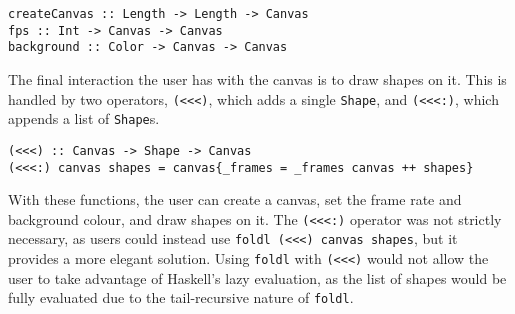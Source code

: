 \documentclass[../main.tex]{subfiles}
\begin{document}
        \begin{lstlisting}[label={lst:fps}, caption={The createCanvas, fps and backgrounds function.}]
createCanvas :: Length -> Length -> Canvas
fps :: Int -> Canvas -> Canvas
background :: Color -> Canvas -> Canvas\end{lstlisting}

        The final interaction the user has with the canvas is to draw shapes on it.
        This is handled by two operators, \verb|(<<<)|, which adds a single
            \verb|Shape|, and \verb|(<<<:)|, which appends a list of \verb|Shape|s.

        \begin{lstlisting}[label={lst:<<<}, caption={The operators to append a frame to the canvas.}]
(<<<) :: Canvas -> Shape -> Canvas
(<<<:) canvas shapes = canvas{_frames = _frames canvas ++ shapes}\end{lstlisting}

        With these functions, the user can create a canvas, set the frame rate and
            background colour, and draw shapes on it.
        The \verb|(<<<:)| operator was not strictly necessary, as users could instead
            use \verb|foldl (<<<) canvas shapes|, but it provides a more elegant solution.
        Using \verb|foldl| with \verb|(<<<)| would not allow the user to take advantage
            of Haskell's lazy evaluation, as the list of shapes would be fully evaluated
            due to the tail-recursive nature of \verb|foldl|.
\end{document}
